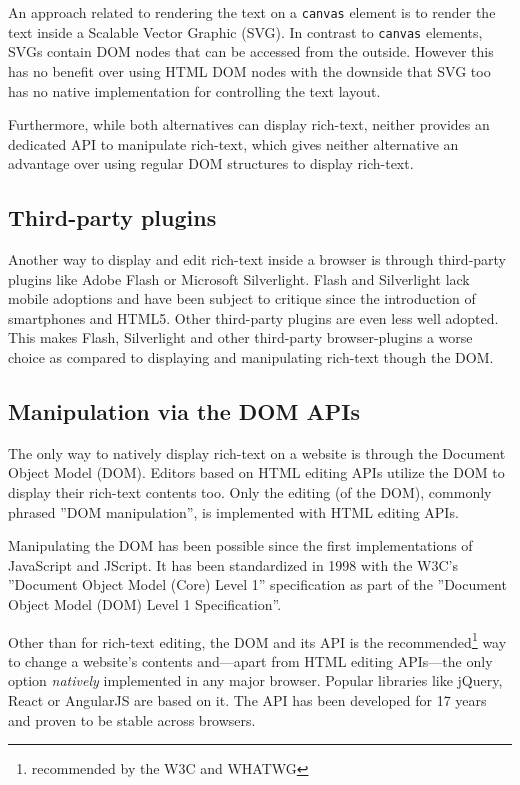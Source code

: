 An approach related to rendering the text on a \texttt{canvas} element is to render the text inside a Scalable Vector Graphic (SVG). In contrast to \texttt{canvas} elements, SVGs contain DOM nodes that can be accessed from the outside. However this has no benefit over using HTML DOM nodes with the downside that SVG too has no native implementation for controlling the text layout.

Furthermore, while both alternatives can display rich-text, neither provides an dedicated API to manipulate rich-text, which gives neither alternative an advantage over using regular DOM structures to display rich-text.

\subsection{Third-party plugins}

Another way to display and edit rich-text inside a browser is through third-party plugins like Adobe Flash or Microsoft Silverlight. Flash and Silverlight lack mobile adoptions and have been subject to critique since the introduction of smartphones and HTML5. Other third-party plugins are even less well adopted. This makes Flash, Silverlight and other third-party browser-plugins a worse choice as compared to displaying and manipulating rich-text though the DOM.

\subsection{Manipulation via the DOM APIs}
\label{subsec:manip_via_dom}

The only way to natively display rich-text on a website is through the Document Object Model (DOM). Editors based on HTML editing APIs utilize the DOM to display their rich-text contents too. Only the editing (of the DOM), commonly phrased ''DOM manipulation'', is implemented with HTML editing APIs.


Manipulating the DOM has been possible since the first implementations of JavaScript and JScript. It has been standardized in 1998 with the W3C's ''Document Object Model (Core) Level 1'' specification as part of the ''Document Object Model (DOM) Level 1 Specification''\cite{DOM1}.


Other than for rich-text editing, the DOM and its API is the recommended\footnote{recommended by the W3C and WHATWG} way to change a website's contents and---apart from HTML editing APIs---the only option \textit{natively} implemented in any major browser. Popular libraries like jQuery, React or AngularJS are based on it. The API has been developed for 17 years and proven to be stable across browsers. 

